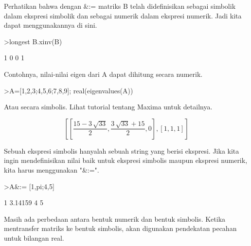 \documentclass[a4paper,10pt]{article}
\begin{document}
\begin{eulernotebook}
\begin{eulercomment}
\begin{eulercomment}
\begin{eulercomment}
\begin{eulercomment}
\begin{eulercomment}
\begin{eulercomment}
\begin{eulercomment}
\begin{eulercomment}
\begin{eulercomment}
Perhatikan bahwa dengan \&:= matriks B telah didefinisikan sebagai
simbolik dalam ekspresi simbolik dan sebagai numerik dalam ekspresi
numerik. Jadi kita dapat menggunakannya di sini.
\end{eulercomment}
\begin{eulerprompt}
>longest B.xinv(B)
\end{eulerprompt}
\begin{euleroutput}
                        1                       0 
                        0                       1 
\end{euleroutput}
\begin{eulercomment}
Contohnya, nilai-nilai eigen dari A dapat dihitung secara numerik.
\end{eulercomment}
\begin{eulerprompt}
>A=[1,2,3;4,5,6;7,8,9]; real(eigenvalues(A))
\end{eulerprompt}
\begin{euleroutput}
  [16.1168,  -1.11684,  0]
\end{euleroutput}
\begin{eulercomment}
Atau secara simbolis. Lihat tutorial tentang Maxima untuk detailnya.
\end{eulercomment}
\begin{eulerformula}
\[
\left[ \left[ \frac{15-3\,\sqrt{33}}{2} , \frac{3\,\sqrt{33}+15}{2}
  , 0 \right]  , \left[ 1 , 1 , 1 \right]  \right] 
\]
\end{eulerformula}
\begin{eulercomment}
Sebuah ekspresi simbolis hanyalah sebuah string yang berisi ekspresi.
Jika kita ingin mendefinisikan nilai baik untuk ekspresi simbolis
maupun ekspresi numerik, kita harus menggunakan "\&:=".
\end{eulercomment}
\begin{eulerprompt}
>A&:= [1,pi;4,5]
\end{eulerprompt}
\begin{euleroutput}
              1       3.14159 
              4             5 
\end{euleroutput}
\begin{eulercomment}
Masih ada perbedaan antara bentuk numerik dan bentuk simbolis. Ketika
mentransfer matriks ke bentuk simbolis, akan digunakan pendekatan
pecahan untuk bilangan real.
\end{eulercomment}

\end{eulercomment}
\end{eulercomment}
\end{eulercomment}
\end{eulercomment}
\end{eulercomment}
\end{eulercomment}
\end{eulercomment}
\end{eulercomment}
\end{eulernotebook}
\end{document}
